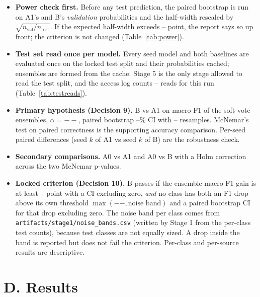 \documentclass[11pt]{article}
\providecommand{\Alpha}{--}
\providecommand{\NBoot}{--}
\providecommand{\MinGainPoints}{--}
\providecommand{\MaxClassDropPoints}{--}
\providecommand{\CILevelPct}{--}
\providecommand{\PowerLimitPoints}{--}
\providecommand{\TestReads}{--}
\begin{document}
\begin{itemize}
  \item \textbf{Power check first.} Before any test prediction, the paired
        bootstrap is run on A1's and B's \emph{validation} probabilities and
        the half-width rescaled by $\sqrt{n_{\mathrm{val}}/n_{\mathrm{test}}}$.
        If the expected half-width exceeds \PowerLimitPoints{} point, the
        report says so up front; the criterion is not changed
        (Table~\ref{tab:power}).
  \item \textbf{Test set read once per model.} Every seed model and both
        baselines are evaluated once on the locked test split and their
        probabilities cached; ensembles are formed from the cache. Stage 5 is
        the only stage allowed to read the test split, and the access log
        counts \TestReads{} reads for this run (Table~\ref{tab:testreads}).
  \item \textbf{Primary hypothesis (Decision 9).} B vs A1 on macro-F1 of the
        soft-vote ensembles, $\alpha = \Alpha$, paired bootstrap
        \CILevelPct\% CI with \NBoot{} resamples. McNemar's test on paired
        correctness is the supporting accuracy comparison. Per-seed paired
        differences (seed $k$ of A1 vs seed $k$ of B) are the robustness check.
  \item \textbf{Secondary comparisons.} A0 vs A1 and A0 vs B with a Holm
        correction across the two McNemar p-values.
  \item \textbf{Locked criterion (Decision 10).} B passes if the ensemble
        macro-F1 gain is at least \MinGainPoints{} point with a CI excluding
        zero, \emph{and} no class has both an F1 drop above its own threshold
        $\max(\MaxClassDropPoints, \text{noise band})$ and a paired bootstrap
        CI for that drop excluding zero. The noise band per class comes from
        \nolinkurl{artifacts/stage1/noise_bands.csv} (written by Stage 1 from
        the per-class test counts), because test classes are not equally
        sized. A drop inside the band is reported but does not
        fail the criterion. Per-class and per-source results are descriptive.
\end{itemize}

\section*{D. Results}
\end{document}
